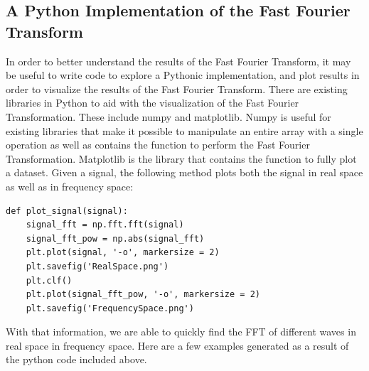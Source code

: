 \documentclass{amsproc}
\begin{document}
\subsection{A Python Implementation of the Fast Fourier Transform}

In order to better understand the results of the Fast Fourier Transform, it may be useful to write code to explore a Pythonic implementation, and  plot results in order to visualize the results of the Fast Fourier Transform. There are existing libraries in Python to aid with the visualization of the Fast Fourier Transformation. These include numpy and matplotlib. Numpy is useful for existing libraries that make it possible to manipulate an entire array with a single operation as well as contains the function to perform the Fast Fourier Transformation. Matplotlib is the library that contains the function to fully plot a dataset. Given a signal, the following method plots both the signal in real space as well as in frequency space:

\begin{Verbatim}[tabsize=4]
def plot_signal(signal):
	signal_fft = np.fft.fft(signal)
	signal_fft_pow = np.abs(signal_fft)
	plt.plot(signal, '-o', markersize = 2)
	plt.savefig('RealSpace.png')
	plt.clf()
	plt.plot(signal_fft_pow, '-o', markersize = 2)
	plt.savefig('FrequencySpace.png')
\end{Verbatim}

With that information, we are able to quickly find the FFT of different waves in real space in frequency space. Here are a few examples generated as a result of the python code included above. 
\end{document}
